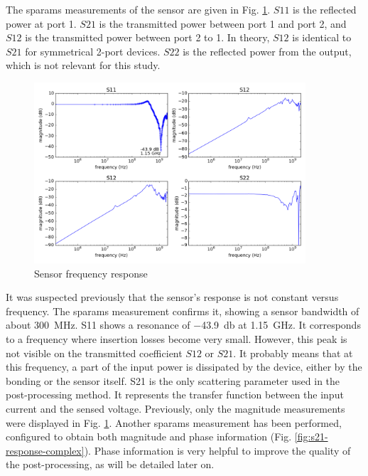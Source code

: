 The \gls{sparams} measurements of the sensor are given in Fig. \ref{fig:sensor-response}.
$S11$ is the reflected power at port 1.
$S21$ is the transmitted power between port 1 and port 2, and $S12$ is the transmitted power between port 2 to 1.
In theory, $S12$ is identical to $S21$ for symmetrical 2-port devices.
$S22$ is the reflected power from the output, which is not relevant for this study.

\begin{figure}[!h]
  \centering
  \includegraphics[width=0.9\textwidth]{src/3/figures/sensor_freq_response.png}
  \caption{Sensor frequency response}
  \label{fig:sensor-response}
\end{figure}

It was suspected previously that the sensor's response is not constant versus frequency.
The \gls{sparams} measurement confirms it, showing a sensor bandwidth of about \SI{300}{\mega\hertz}.
S11 shows a resonance of \SI{-43.9}{\decibel} at \SI{1.15}{\giga\hertz}.
It corresponds to a frequency where insertion losses become very small.
However, this peak is not visible on the transmitted coefficient $S12$ or $S21$.
It probably means that at this frequency, a part of the input power is dissipated by the device, either by the bonding or the sensor itself.
S21 is the only scattering parameter used in the post-processing method.
It represents the transfer function between the input current and the sensed voltage.
Previously, only the magnitude measurements were displayed in Fig. \ref{fig:sensor-response}.
Another \gls{sparams} measurement has been performed, configured to obtain both magnitude and phase information (Fig. \ref{fig:s21-response-complex}).
Phase information is very helpful to improve the quality of the post-processing, as will be detailed later on.

